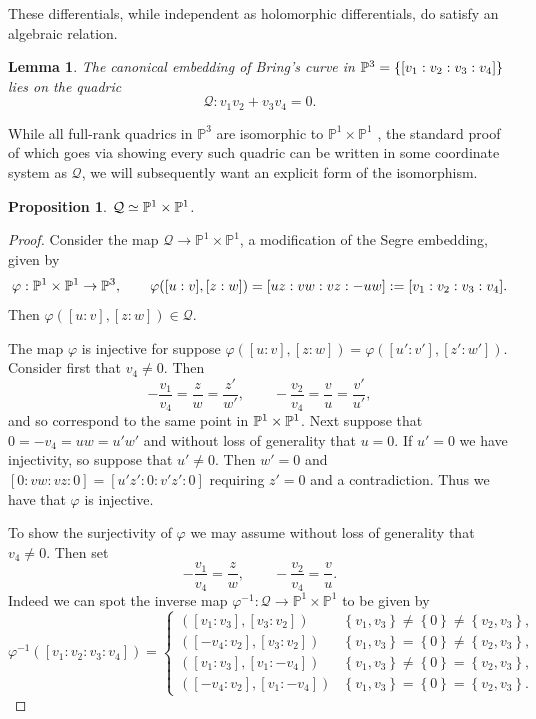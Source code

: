 \documentclass{amsart}
\newtheorem{lemma}[theorem]{Lemma}
\newtheorem{prop}[theorem]{Proposition}
\newcommand{\pbrace}[1]{\left\{ #1 \right\} }
\begin{document}
These differentials, while independent as holomorphic differentials, do satisfy an algebraic relation.

\begin{lemma}
The canonical embedding of Bring's curve in $\mathbb{P}\sp3=\pbrace{[v_1:v_2:v_3:v_4]}$ lies on the quadric
\begin{equation}\label{quaddif}
\mathcal{Q}:  v_1v_2+v_3v_4=0  . 
\end{equation}
\end{lemma}
While all full-rank quadrics in $\mathbb{P}^3$ are isomorphic to $\mathbb{P}^1 \times \mathbb{P}^1$ \cite{Vakil2010}, the standard proof of which goes via showing every such quadric can be written in some coordinate system as $\mathcal{Q}$, we will subsequently want an explicit form of the isomorphism.
\begin{prop}\label{prop: quadric of canonical embedding isomorphic to PxP}
$\mathcal{Q}\simeq \mathbb{P}\sp1\times\mathbb{P}\sp1$.
\end{prop}
\begin{proof}
Consider the map 
$\mathcal{Q} \to \mathbb{P}^1 \times \mathbb{P}^1$, 
a modification of the Segre embedding, given by
$$
\varphi: \mathbb{P}\sp1\times\mathbb{P}\sp1\rightarrow \mathbb{P}\sp3,\qquad
\varphi([u:v],[z:w])=[uz:vw:vz:-uw]:=[v_1:v_2:v_3:v_4]  .
$$
Then $\varphi([u:v],[z:w])\in \mathcal{Q}$.

The map $\varphi$ is injective for suppose $\varphi([u:v],[z:w])=\varphi([u':v'],[z':w'])$. Consider first that $v_4\ne0$. Then
$$
-\frac{v_1}{v_4}=\frac{z}{w}=\frac{z'}{w'},\qquad -\frac{v_2}{v_4}=\frac{v}{u}=\frac{v'}{u'} , 
$$
and so correspond to the same point in $\mathbb{P}\sp1\times\mathbb{P}\sp1$. Next suppose that $0=-v_4=uw=u'w'$ and without loss of generality that $u=0$. If $u'=0$ we have injectivity, so suppose that $u'\ne0$. Then $w'=0$ and $[0:vw:vz:0]=[u'z':0:v'z':0]$ requiring $z'=0$ and a contradiction. Thus we have that $\varphi$ is injective.

To show the surjectivity of $\varphi$ we may assume without loss of generality that $v_4\ne0$. Then set
$$
-\frac{v_1}{v_4}=\frac{z}{w},\qquad -\frac{v_2}{v_4}=\frac{v}{u}  .
$$
Indeed we can spot the inverse map $\varphi^{-1} : \mathcal{Q} \to \mathbb{P}^1 \times \mathbb{P}^1$ to be given by 
\[
\varphi^{-1}([v_1:v_2:v_3:v_4]) = \left \lbrace \begin{array}{cc}
    ([v_1:v_3], [v_3:v_2]) & \pbrace{v_1, v_3} \neq \pbrace{0} \neq \pbrace{v_2, v_3}, \\
    ([-v_4:v_2], [v_3:v_2]) & \pbrace{v_1, v_3} = \pbrace{0} \neq \pbrace{v_2, v_3} ,\\
    ([v_1:v_3], [v_1:-v_4]) & \pbrace{v_1, v_3} \neq \pbrace{0} = \pbrace{v_2, v_3} ,\\
    ([-v_4:v_2], [v_1:-v_4]) & \pbrace{v_1, v_3} = \pbrace{0} = \pbrace{v_2, v_3}.
\end{array} \right .
\]
\end{proof}
\end{document}
